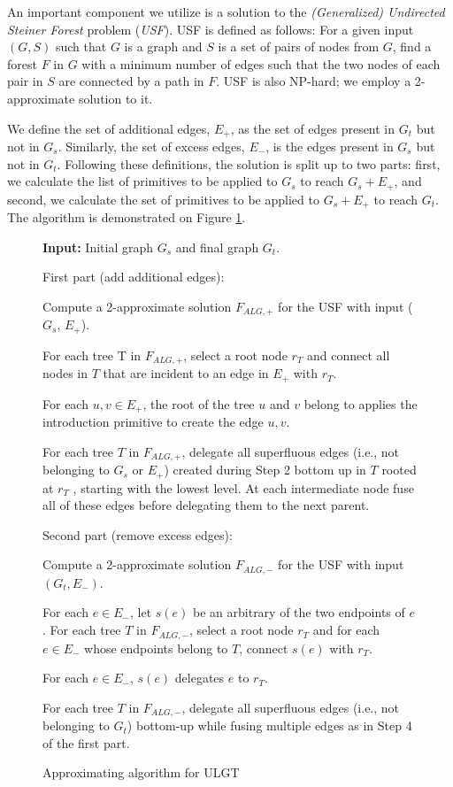 \documentclass{article}
\begin{document}
An important component we utilize is a solution to the \textit{(Generalized) Undirected Steiner Forest} problem (\textit{USF}). USF is defined as follows: For a given input $(G, S)$ such that $G$ is a graph and $S$ is a set of pairs of nodes from $G$, find a forest $F$ in $G$ with a minimum number of edges such that the two nodes of each pair in $S$ are connected by a path in $F$. USF is also NP-hard; we employ a 2-approximate solution to it.

We define the set of additional edges, $E_+$, as the set of edges present in $G_t$ but not in $G_s$. Similarly, the set of excess edges, $E_-$, is the edges present in $G_s$ but not in $G_t$. Following these definitions, the solution is split up to two parts: first, we calculate the list of primitives to be applied to $G_s$ to reach $G_s + E_+$, and second, we calculate the set of primitives to be applied to $G_s + E_+$ to reach $G_t$. The algorithm is demonstrated on Figure \ref{fig:ulgt-algorithm}.

\begin{figure}
  \textbf{Input:} Initial graph $G_s$ and final graph $G_t$.
  \vspace{1em}

  First part (add additional edges):
  \begin{compactenum}
  \item Compute a 2-approximate solution $F_{ALG,+}$ for the USF with input ($G_s$, $E_+$).
  \item For each tree T in $F_{ALG,+}$, select a root node $r_T$ and connect all nodes in $T$ that are incident to an edge in $E_+$ with $r_T$.
    \item For each ${u, v} \in E_+$, the root of the tree $u$ and $v$ belong to applies the introduction
  primitive to create the edge ${u, v}$.
  \item For each tree $T$ in $F_{ALG,+}$, delegate all superfluous edges (i.e., not belonging to $G_s$ or
  $E_+$) created during Step 2 bottom up in $T$ rooted at $r_T$ , starting with the lowest level.
  At each intermediate node fuse all of these edges before delegating them to the next
  parent.
  \end{compactenum}
  \vspace{1em}
  Second part (remove excess edges):
  \begin{compactenum}
  \item Compute a 2-approximate solution $F_{ALG,-}$ for the USF with input $(G_t, E_-)$.
    \item For each $e \in E_-$, let $s(e)$ be an arbitrary of the two endpoints of $e$. For each tree $T$
    in $F_{ALG,-}$, select a root node $r_T$ and for each $e \in E_-$ whose endpoints belong to $T$,
    connect $s(e)$ with $r_T$.
    \item For each $e \in E_-$, $s(e)$ delegates $e$ to $r_T$.
    \item For each tree $T$ in $F_{ALG,-}$, delegate all superfluous edges (i.e., not belonging to $G_t$)
  bottom-up while fusing multiple edges as in Step 4 of the first part.
  \end{compactenum}
  \caption{Approximating algorithm for ULGT}
  \label{fig:ulgt-algorithm}
\end{figure}
\end{document}
